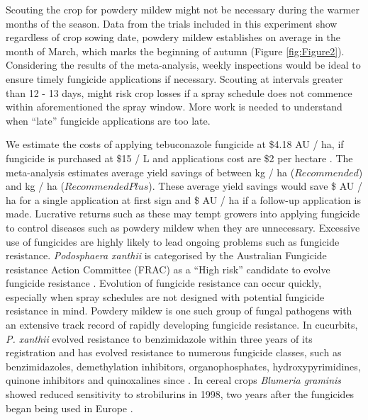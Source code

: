 \documentclass[agronomy,article,submit,moreauthors,pdftex]{mdpi}
\begin{document}
Scouting the crop for powdery mildew might not be necessary during the warmer months of the season.
Data from the trials included in this experiment show regardless of crop sowing date, powdery mildew establishes on average in the month of March, which marks the beginning of autumn (Figure \ref{fig:Figure2}).
Considering the results of the meta-analysis, weekly inspections would be ideal to ensure timely fungicide applications if necessary.
Scouting at intervals greater than 12 - 13 days, might risk crop losses if a spray schedule does not commence within aforementioned the spray window.
More work is needed to understand when ``late'' fungicide applications are too late.

We estimate the costs of applying tebuconazole fungicide at \$4.18 AU / ha, if fungicide is purchased at \$15 / L \citep{Simfendorfer2011} and applications cost are \$2 per hectare \citep{QueenslandGovernment2019}.
The meta-analysis estimates average yield savings of between kg / ha (\(Recommended\)) and kg / ha (\(RecommendedPlus\)).
These average yield savings would save \$ AU / ha for a single application at first sign and \$ AU / ha if a follow-up application is made.
Lucrative returns such as these may tempt growers into applying fungicide to control diseases such as powdery mildew when they are unnecessary.
Excessive use of fungicides are highly likely to lead ongoing problems such as fungicide resistance.
\emph{Podosphaera xanthii} is categorised by the Australian Fungicide resistance Action Committee (FRAC) as a ``High risk'' candidate to evolve fungicide resistance \citep{FRACrisk2019}.
Evolution of fungicide resistance can occur quickly, especially when spray schedules are not designed with potential fungicide resistance in mind.
Powdery mildew is one such group of fungal pathogens with an extensive track record of rapidly developing fungicide resistance.
In cucurbits, \emph{P. xanthii} evolved resistance to benzimidazole within three years of its registration \citep{Peterson1973} and has evolved resistance to numerous fungicide classes, such as benzimidazoles, demethylation inhibitors, organophosphates, hydroxypyrimidines, quinone inhibitors and quinoxalines since \citep{Mcgrath2001}.
In cereal crops \emph{Blumeria graminis} showed reduced sensitivity to strobilurins in 1998, two years after the fungicides began being used in Europe \citep{Chin2001}.
\end{document}
